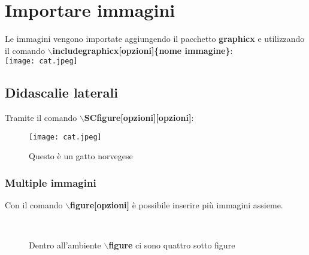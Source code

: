 \documentclass[a4paper, 12pt]{book}
\theoremstyle{plain}
\begin{document}
	\section{Importare immagini}
	Le immagini vengono importate aggiungendo il pacchetto
	\textbf{graphicx} e utilizzando il comando \textbf{$\backslash$includegraphicx[opzioni]\{nome immagine\}}:\\
	\texttt{[image: cat.jpeg]}

	\subsection{Didascalie laterali}
	Tramite il comando \textbf{$\backslash$SCfigure[opzioni][opzioni]}:
	\begin{SCfigure}[50][h!]
		\texttt{[image: cat.jpeg]}
		\caption{Questo è un gatto norvegese}
	\end{SCfigure}
	\subsubsection{Multiple immagini}
	Con il comando \textbf{$\backslash$figure[opzioni]} è possibile
	inserire più immagini assieme. 
	\begin{figure}[h!]
		\centering
		\quad
		\\
		\quad
		\caption{Dentro all'ambiente \textbf{$\backslash$figure} ci sono quattro
		sotto figure}
	\end{figure}
\end{document}
